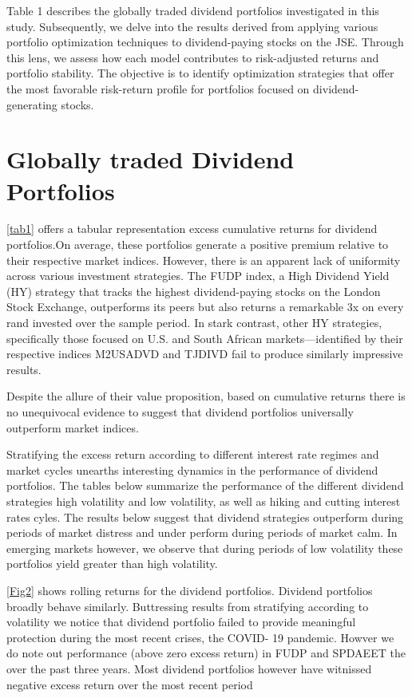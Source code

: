 \documentclass[11pt,preprint, authoryear]{elsarticle}
\numberwithin{equation}{section}
\numberwithin{figure}{section}
\numberwithin{table}{section}
\begin{document}
Table 1 describes the globally traded dividend portfolios investigated
in this study. Subsequently, we delve into the results derived from
applying various portfolio optimization techniques to dividend-paying
stocks on the JSE. Through this lens, we assess how each model
contributes to risk-adjusted returns and portfolio stability. The
objective is to identify optimization strategies that offer the most
favorable risk-return profile for portfolios focused on
dividend-generating stocks.

\hypertarget{globally-traded-dividend-portfolios}{%
\section{Globally traded Dividend
Portfolios}\label{globally-traded-dividend-portfolios}}

\ref{tab1} offers a tabular representation excess cumulative returns for
dividend portfolios.On average, these portfolios generate a positive
premium relative to their respective market indices. However, there is
an apparent lack of uniformity across various investment strategies. The
FUDP index, a High Dividend Yield (HY) strategy that tracks the highest
dividend-paying stocks on the London Stock Exchange, outperforms its
peers but also returns a remarkable 3x on every rand invested over the
sample period. In stark contrast, other HY strategies, specifically
those focused on U.S. and South African markets---identified by their
respective indices M2USADVD and TJDIVD fail to produce similarly
impressive results.

Despite the allure of their value proposition, based on cumulative
returns there is no unequivocal evidence to suggest that dividend
portfolios universally outperform market indices.

Stratifying the excess return according to different interest rate
regimes and market cycles unearths interesting dynamics in the
performance of dividend portfolios. The tables below summarize the
performance of the different dividend strategies high volatility and low
volatility, as well as hiking and cutting interest rates cyles. The
results below suggest that dividend strategies outperform during periods
of market distress and under perform during periods of market calm. In
emerging markets however, we observe that during periods of low
volatility these portfolios yield greater than high volatility.

\ref{Fig2} shows rolling returns for the dividend portfolios. Dividend
portfolios broadly behave similarly. Buttressing results from
stratifying according to volatility we notice that dividend portfolio
failed to provide meaningful protection during the most recent crises,
the COVID- 19 pandemic. Howver we do note out performance (above zero
excess return) in FUDP and SPDAEET the over the past three years. Most
dividend portfolios however have witnissed negative excess return over
the most recent period
\end{document}
